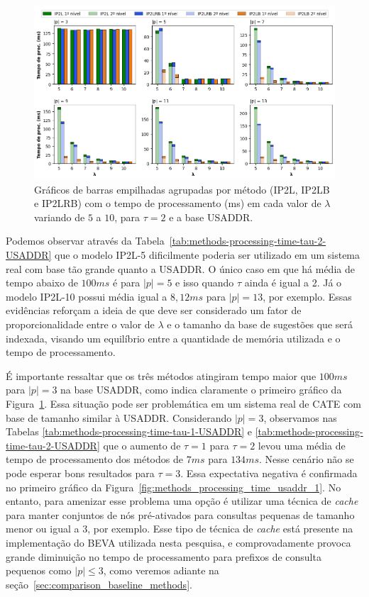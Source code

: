 \begin{figure} [h]
    \centering
    \includegraphics[width=1.0\textwidth]{figures/methods_processing_time_usaddr_2.png}
    \caption{Gráficos de barras empilhadas agrupadas por método (IP2L, IP2LB e IP2LRB) com o tempo de processamento (ms) em cada valor de $\lambda$ variando de $5$ a $10$, para $\tau=2$ e a base USADDR.}
    \label{fig:methods_processing_time_usaddr_2}
\end{figure}

Podemos observar através da Tabela~\ref{tab:methods-processing-time-tau-2-USADDR} que o modelo IP2L-5  dificilmente poderia ser utilizado em um sistema real com base tão grande quanto a USADDR. O único caso em que há média de tempo abaixo de $100ms$ é para $|p|=5$ e isso quando $\tau$ ainda é igual a 2. Já o modelo IP2L-10 possui média igual a $8,12ms$ para $|p|=13$, por exemplo. Essas evidências reforçam a ideia de que deve ser considerado um fator de proporcionalidade entre o valor de $\lambda$ e o tamanho da base de sugestões que será indexada, visando um equilíbrio entre a quantidade de memória utilizada e o tempo de processamento.

É importante ressaltar que os três métodos atingiram tempo maior que $100ms$ para $|p|=3$ na base USADDR, como indica claramente o primeiro gráfico da Figura~\ref{fig:methods_processing_time_usaddr_2}. Essa situação pode ser problemática em um sistema real de CATE com base de tamanho similar à USADDR. Considerando $|p|=3$, observamos nas Tabelas \ref{tab:methods-processing-time-tau-1-USADDR} e \ref{tab:methods-processing-time-tau-2-USADDR} que o aumento de $\tau=1$ para $\tau=2$ levou uma média de tempo de processamento dos métodos de $7ms$ para $134ms$. Nesse cenário não se pode esperar bons resultados para $\tau=3$. Essa expectativa negativa é confirmada no primeiro gráfico da Figura~\ref{fig:methods_processing_time_usaddr_1}. No entanto, para amenizar esse problema uma opção é utilizar uma técnica de \textit{cache} para manter conjuntos de nós pré-ativados para consultas pequenas de tamanho menor ou igual a 3, por exemplo. Esse tipo de técnica de \textit{cache} está presente na implementação do BEVA utilizada nesta pesquisa, e comprovadamente provoca grande diminuição no tempo de processamento para prefixos de consulta pequenos como $|p| \leq 3$, como veremos adiante na seção~\ref{sec:comparison_baseline_methods}.




